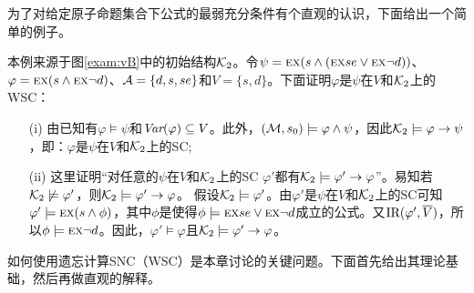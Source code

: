 为了对给定原子命题集合下公式的最弱充分条件有个直观的认识，下面给出一个简单的例子。

\begin{example}\label{examp:WSC}
	本例来源于图\ref{exam:vB}中的初始结构${\cal K}_2$。令$\psi = \textsc{e} \textsc{x}(s \wedge (\textsc{e} \textsc{x} se \vee \textsc{e} \textsc{x} \neg d))$、$\varphi = \textsc{e} \textsc{x}(s \wedge \textsc{e} \textsc{x} \neg d)$、${\cal A} =\{d, s, se\}$和$V = \{s, d\}$。下面证明$\varphi$是$\psi$在$V$和${\cal K}_2$上的WSC：
	\begin{itemize}
		\item[(i)] 由已知有$\varphi \models \psi$和$\textit{Var}(\varphi) \subseteq V$。此外，$({\cal M}, s_0) \models \varphi \wedge \psi$，因此${\cal K}_2 \models \varphi \rightarrow \psi$，即：$\varphi$是$\psi$在$V$和${\cal K}_2$上的SC;
		\item[(ii)] 这里证明“对任意的$\psi$在$V$和${\cal K}_2$上的SC $\varphi'$都有${\cal K}_2 \models \varphi' \rightarrow \varphi$”。易知若${\cal K}_2 \not \models \varphi'$，则${\cal K}_2\models \varphi' \rightarrow \varphi$。
		假设${\cal K}_2 \models \varphi'$。由$\varphi'$是$\psi$在$V$和${\cal K}_2$上的SC可知$\varphi' \models \textsc{e} \textsc{x}(s \wedge \phi)$，其中$\phi$是使得$\phi\models \textsc{e} \textsc{x} se \vee \textsc{e} \textsc{x} \neg d$成立的公式。又$\textrm{IR}(\varphi', \overline V)$，所以$\phi \models \textsc{e} \textsc{x} \neg d$。因此，$\varphi' \models \varphi$且${\cal K}_2 \models \varphi' \rightarrow \varphi$。
	\end{itemize}
\end{example}


如何使用遗忘计算SNC（WSC）是本章讨论的关键问题。下面首先给出其理论基础，然后再做直观的解释。

